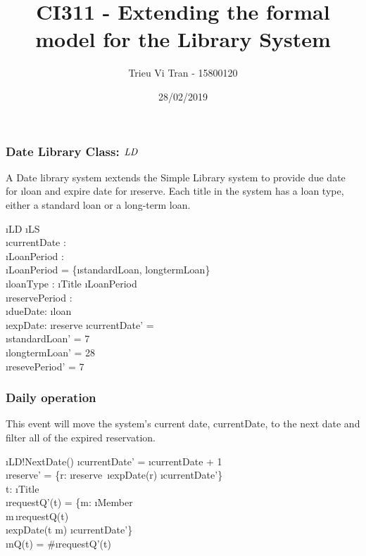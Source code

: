 \documentclass[12pt,a4paper]{article}
\title{CI311 - Extending the formal model for the Library System}
\author{Trieu Vi Tran - 15800120}
\date{28/02/2019}
\begin{document}
\maketitle

\subsubsection*{Date Library Class: $\mathit{LD}$}

A Date library system \i{extends} the Simple Library system to provide due date for \i{loan} and expire date for \i{reserve}. Each title in the system has a loan type, either a standard loan or a long-term loan.
\begin{showspecs}
	\begin{spec}{\i{LD}}
		\i{LS}\\
		\i{currentDate} : \\
        \i{LoanPeriod} : \\
        \i{LoanPeriod} = \{\i{standardLoan, longtermLoan}\}\\
        \i{loanType} : \i{Title} \to \i{LoanPeriod}\\
        \i{reservePeriod} : \\
		\i{dueDate}: \i{loan} \tfun {}\\
		\i{expDate}: \i{reserve} \tfun {}
		\post
		\i{currentDate'} = \\
        \i{standardLoan'} = 7\\
        \i{longtermLoan'} = 28\\
        \i{resevePeriod'} = 7
	\end{spec}
\end{showspecs}

\newpage
\subsubsection*{Daily operation}

\noindent This event will move the system's current date, currentDate, to the next date and filter all of the expired reservation.
\begin{showspecs}
    \begin{spec}{\i{LD!NextDate()}}
            \post
            \i{currentDate'} = \i{currentDate} + 1\\
            \i{reserve'} = \{r: \i{reserve}\, \bullet \i{expDate(r)} \ge \i{currentDate'}\}\\
            \forall t: \i{Title}\, \bullet\\
            \hspace{0.5cm}\i{requestQ'(t)} = \{m: \i{Member}\, \bullet\\
            \hspace{4cm}m\in {}\,\i{requestQ}(t)\,\wedge\\
            \hspace{4cm}\i{expDate(t \mapsto m)} \ge \i{currentDate'}\}\\
            \hspace{0.5cm}\i{nQ}(t) = \#\i{requestQ'}(t)
    \end{spec}
\end{showspecs}
\end{document}

